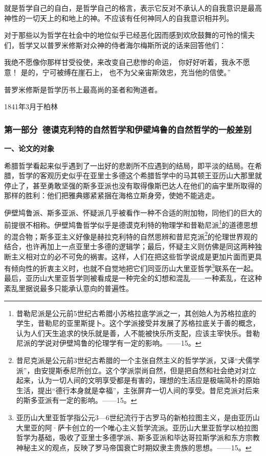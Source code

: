 \documentclass[a4paper,twoside,12pt]{ctexart}
\begin{document}
 就是哲学自己的自白，是哲学自己的格言，表示它反对不承认人的自我意识是最高神性的一切天上的和地上的神。不应该有任何神同人的自我意识相并列。

对于那些以为哲学在社会中的地位似乎已经恶化因而感到欢欣鼓舞的可怜的懦夫们，哲学又以普罗米修斯对众神的侍者海尔梅斯所说的话来回答他们：

    \begin{fangsong}
 我绝不愿像你那样甘受役使，来改变自己悲惨的命运，
    你好好听着，我永不愿意！
    是的，宁可被缚在崖石上，
    也不为父亲宙斯效忠，充当他的信使。”       
    \end{fangsong}

普罗米修斯是哲学历书上最高尚的圣者和殉道者。

1841年3月于柏林

\subsubsection{第一部分~德谟克利特的自然哲学和伊壁鸠鲁的自然哲学的一般差别}
\textbf{一、论文的对象}

 希腊哲学看起来似乎遇到了一出好的悲剧所不应遇到的结局，即平淡的结局。在希腊，哲学的客观历史似乎在亚里士多德这个希腊哲学中的马其顿王亚历山大那里就停止了，甚至勇敢坚强的斯多亚派也没有取得像斯巴达人在他们的庙宇里所取得的那样的胜利：他们把雅典娜紧紧捆在海格立斯身旁，使她不能逃走。

伊壁鸠鲁派、斯多亚派、怀疑派几乎被看作一种不合适的附加物，同他们的巨大的前提很不相称。伊壁鸠鲁哲学似乎是德谟克利特的物理学和昔勒尼派\footnote{昔勒尼派是公元前5世纪古希腊小苏格拉底学派之一，其创始人为苏格拉底的学生，昔勒尼的亚里斯提卜。这个学派接受并发展了苏格拉底关于善的概念，认为人们天生追求的快乐就是善，人不能被快乐所支配，应该主宰快乐。昔勒尼派的学说对伊壁鸠鲁的伦理学有一定的影响。——15。}的道德思想的混合物；斯多亚主义好像是赫拉克利特的自然思辨和昔尼克派\footnote{昔尼克派是公元前3世纪古希腊的一个主张自然主义的哲学学派，又译“犬儒学派”，由安提斯泰尼所创立。这个学派崇尚自然，但是把自然和社会绝对对立起来，认为一切人间的文明享受都是有害的，理想的生活应是极端简朴的原始生活，提出“德行本身就是幸福”，主张屏弃一切人间的享受。昔尼克派对后来的斯多亚派有一定的影响。——15。}的伦理世界观的结合，也许再加上一点亚里士多德的逻辑学；最后，怀疑主义则仿佛是同这两种独断主义相对立的必不可免的祸害。这样，人们在把这些哲学说成是更加片面而更具有倾向性的折衷主义时，也就不自觉地把它们同亚历山大里亚哲学\footnote{亚历山大里亚哲学指公元3—6世纪流行于古罗马的新柏拉图主义，是由亚历山大里亚的阿·萨卡创立的一个唯心主义哲学流派。亚历山大里亚哲学以柏拉图哲学为基础，吸收了亚里士多德学派、斯多亚派和毕达哥拉斯学派和东方宗教神秘主义的观点，反映了罗马帝国衰亡时期奴隶主贵族的思想。——15。}联系在一起。最后，亚历山大里亚哲学则被看成是一种完全的幻想和混乱——一种紊乱，在这种紊乱里据说最多只能承认意向的普遍性。
\end{document}
